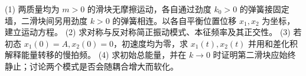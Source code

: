 (1) 两质量均为 \(m>0\) 的滑块无摩擦运动，各自通过劲度 \(k_0>0\) 的弹簧接固定墙，二滑块间另用劲度 \(k>0\) 的弹簧相连。以各自平衡位置位移 \(x_1,x_2\) 为坐标，建立运动方程。
(2) 求对称与反对称简正振动模式、本征频率及其正交性。
(3) 若初态 \(x_1(0)=A,x_2(0)=0\)，初速度均为零，求 \(x_1(t),x_2(t)\) 并用和差化积解释能量转移的慢拍频。
(4) 求初始总能量，并在 \(k\to0\) 时证明第二滑块应始终静止；讨论两个模式是否会随耦合增大而软化。
